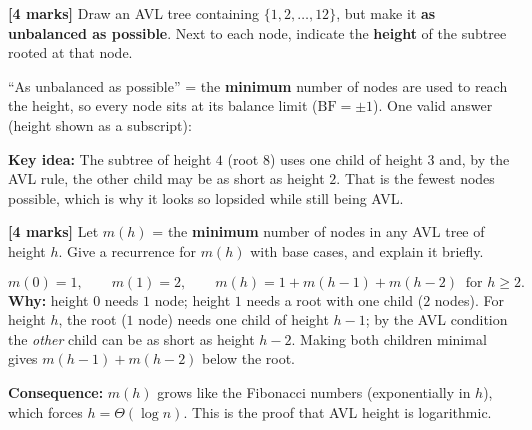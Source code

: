 \documentclass[11pt]{article}
\begin{document}
\begin{exambox}
\textbf{[4 marks]} Draw an AVL tree containing $\{1, 2, \ldots, 12\}$, but make it \textbf{as unbalanced as possible}. Next to each node, indicate the \textbf{height} of the subtree rooted at that node.

\begin{answerband}
``As unbalanced as possible'' = the \textbf{minimum} number of nodes are used to reach the height, so every node sits at its balance limit ($\text{BF} = \pm 1$). One valid answer (height shown as a subscript):

\begin{center}
\end{center}

\textcolor{violetT}{\textbf{Key idea:}} The subtree of height $4$ (root $8$) uses one child of height $3$ and, by the AVL rule, the other child may be as short as height $2$. That is the fewest nodes possible, which is why it looks so lopsided while still being AVL.
\end{answerband}
\end{exambox}

\begin{exambox}
\textbf{[4 marks]} Let $m(h)$ = the \textbf{minimum} number of nodes in any AVL tree of height $h$. Give a recurrence for $m(h)$ with base cases, and explain it briefly.

\begin{answerband}
\[
  m(0) = 1, \qquad m(1) = 2, \qquad m(h) = 1 + m(h-1) + m(h-2) \;\; \text{for } h \geq 2.
\]
\textbf{Why:} height $0$ needs $1$ node; height $1$ needs a root with one child ($2$ nodes). For height $h$, the root ($1$ node) needs one child of height $h-1$; by the AVL condition the \emph{other} child can be as short as height $h-2$. Making both children minimal gives $m(h-1) + m(h-2)$ below the root.

\smallskip
\textcolor{violetT}{\textbf{Consequence:}} $m(h)$ grows like the Fibonacci numbers (exponentially in $h$), which forces $h = \Theta(\log n)$. This is the proof that AVL height is logarithmic.
\end{answerband}
\end{exambox}
\end{document}
